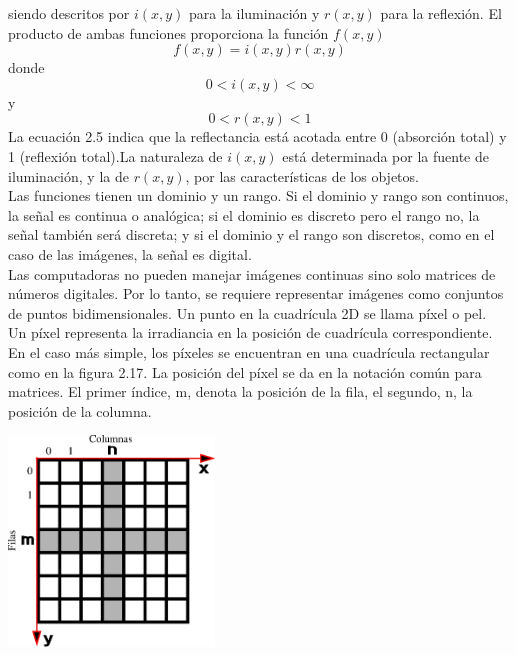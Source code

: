 siendo descritos por $i(x,y)$ para la iluminación y $r(x,y)$ para la reflexión. El producto de ambas funciones
proporciona la función $f(x,y)$
\begin{equation}
	f(x,y) = i(x,y)r(x,y)
\end{equation}
donde
\begin{equation}
	0 < i(x,y) < \infty
\end{equation}
y
\begin{equation}
	0 < r(x,y) < 1
\end{equation}
La ecuación 2.5 indica que la reflectancia está acotada entre 0 (absorción total) y
1 (reflexión total).La naturaleza de $i(x,y)$ está determinada por la fuente de iluminación, y la de $r(x,y)$, por
las características de los objetos.\\
Las funciones tienen un
dominio y un rango. Si el dominio y rango son continuos, la señal es continua o
analógica; si el dominio es discreto pero el rango no, la señal también será discreta; y si
el dominio y el rango son discretos, como en el caso de las imágenes, la señal es digital.\\
Las computadoras no pueden manejar imágenes continuas sino solo matrices de números digitales. Por lo tanto, se
requiere representar imágenes como conjuntos de puntos bidimensionales. Un punto en la cuadrícula 2D se llama píxel o pel.\\
Un píxel representa la irradiancia en la posición de cuadrícula correspondiente. En el caso más simple, los píxeles se encuentran
en una cuadrícula rectangular como en la figura 2.17. La posición del píxel se da en la notación común para matrices.
El primer índice, m, denota la posición de la fila, el segundo, n, la posición de la columna.
\begin{center}
	\includegraphics[width=0.41\textwidth]{Contenido/Cuerpo/Capitulo2/Fig8.eps}
	\label{fig:MarcoTeorico:Fig17}
\end{center}
